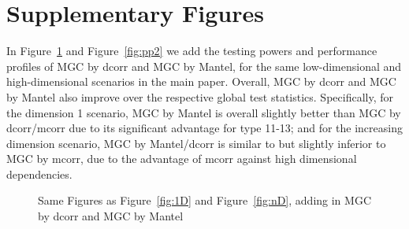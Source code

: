 \documentclass[11pt]{article}
\begin{document}
\section{Supplementary Figures}

In Figure~\ref{fig:D2} and Figure~\ref{fig:pp2} we add the testing powers and performance profiles of MGC by dcorr and MGC by Mantel, for the same low-dimensional and high-dimensional scenarios in the main paper. Overall, MGC by dcorr and MGC by Mantel also improve over the respective global test statistics. Specifically, for the dimension 1 scenario, MGC by Mantel is overall slightly better than MGC by dcorr/mcorr due to its significant advantage for type 11-13; and for the increasing dimension scenario, MGC by Mantel/dcorr is similar to but slightly inferior to MGC by mcorr, due to the advantage of mcorr against high dimensional dependencies.

\begin{figure}[htbp]
\hfil
{}
\caption{Same Figures as Figure~\ref{fig:1D} and Figure~\ref{fig:nD}, adding in MGC by dcorr and MGC by Mantel}
\label{fig:D2}
\end{figure}
\end{document}
